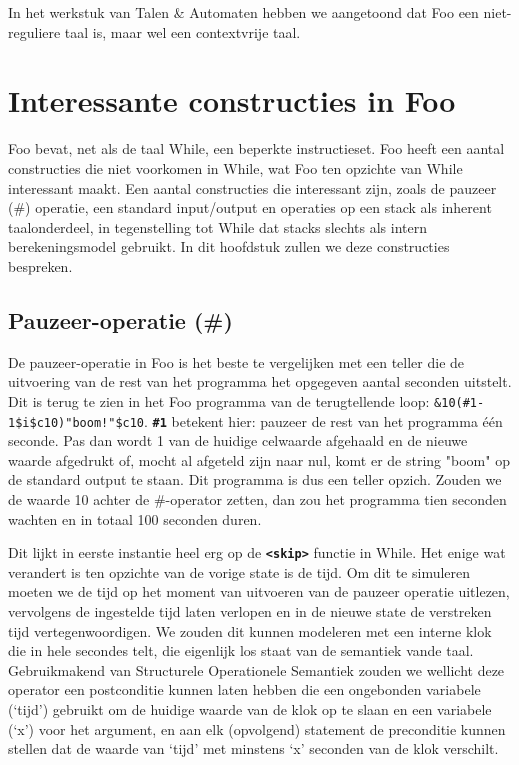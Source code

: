 \documentclass[11pt]{article}
\begin{document}
In het werkstuk van Talen \& Automaten hebben we aangetoond dat Foo een niet-reguliere taal is, maar wel een contextvrije taal.

\section{Interessante constructies in Foo}

Foo bevat, net als de taal While, een beperkte instructieset. 
Foo heeft een aantal constructies die niet voorkomen in While, wat Foo ten opzichte van While interessant maakt.
Een aantal constructies die interessant zijn, zoals de pauzeer (\#) operatie, een standard input/output en operaties op een stack als inherent taalonderdeel, in tegenstelling tot While dat stacks slechts als intern berekeningsmodel gebruikt.
In dit hoofdstuk zullen we deze constructies bespreken.

\subsection{Pauzeer-operatie (\#)}
De pauzeer-operatie in Foo is het beste te vergelijken met een teller die de uitvoering van de rest van het programma het opgegeven aantal seconden uitstelt. 
Dit is terug te zien in het Foo programma van de terugtellende loop: \verb|&10(#1-1$i$c10)"boom!"$c10|.
{\bf \verb|#1|} betekent hier: pauzeer de rest van het programma \'e\'en seconde. 
Pas dan wordt 1 van de huidige celwaarde afgehaald en de nieuwe waarde afgedrukt of, mocht al afgeteld zijn naar nul, komt er de string "boom" op de standard output te staan.
Dit programma is dus een teller opzich.
Zouden we de waarde 10 achter de \#-operator zetten, dan zou het programma tien seconden wachten en in totaal 100 seconden duren.


Dit lijkt in eerste instantie heel erg op de {\bf\verb|<skip>|} functie in While.
Het enige wat verandert is ten opzichte van de vorige state is de tijd.
Om dit te simuleren moeten we de tijd op het moment van uitvoeren van de pauzeer operatie uitlezen, vervolgens de ingestelde tijd laten verlopen en in de nieuwe state de verstreken tijd vertegenwoordigen.
We zouden dit kunnen modeleren met een interne klok die in hele secondes telt, die eigenlijk los staat van de semantiek vande taal.
Gebruikmakend van Structurele Operationele Semantiek zouden we wellicht deze operator een postconditie kunnen laten hebben die een ongebonden variabele (`tijd') gebruikt om de huidige waarde van de klok op te slaan en een variabele (`x') voor het argument, en aan elk (opvolgend) statement de preconditie kunnen stellen dat de waarde van `tijd' met minstens `x' seconden van de klok verschilt.
\end{document}
